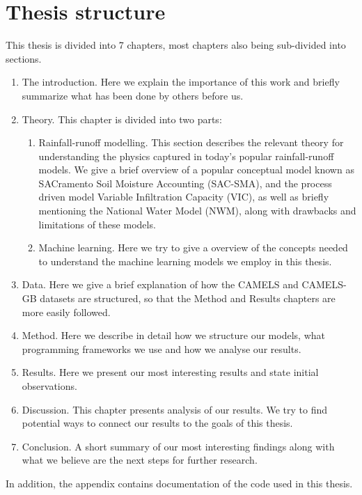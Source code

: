 \section{Thesis structure}
This thesis is divided into 7 chapters, most chapters also being sub-divided into
sections. 
\begin{enumerate}
\item  The introduction. Here we explain the importance of this work and briefly summarize what has been done by others before us.
\item Theory. This chapter is divided into two parts:
    \begin{enumerate}
    \item Rainfall-runoff modelling. This section describes the relevant theory 
        for understanding the physics captured in today's popular rainfall-runoff 
            models. We give a brief overview of a popular conceptual model known 
            as SACramento Soil Moisture Accounting (SAC-SMA), and 
            the process driven model Variable Infiltration Capacity (VIC), as well 
            as briefly mentioning the
            National Water Model (NWM), along with drawbacks and limitations 
            of these models. 
    \item Machine learning. Here we try to give a overview of the concepts 
        needed to understand the machine learning models we employ in this thesis. 
    \end{enumerate}
    \item Data. Here we give a brief explanation of how the CAMELS and CAMELS-GB 
    datasets are structured, so that the Method and Results chapters are more easily followed.
    \item Method. Here we describe in detail how we structure our models, what 
    programming frameworks we use and how we analyse our results.     
    \item Results. Here we present our most interesting results and state initial 
        observations.
    \item Discussion. This chapter presents analysis of our results. We try to 
        find potential ways to connect our results to the goals of this thesis.
    \item Conclusion. A short summary of our most interesting findings along with 
        what we believe are the next steps for further research.
\end{enumerate}
In addition, the appendix contains documentation of the code used in this thesis.
\begin{comment}
\nocite{4160265}
\nocite{mckinney-proc-scipy-2010}
\nocite{2020NumPy-Array}
\nocite{2020SciPy-NMeth}
\nocite{NEURIPS2019_9015}
\nocite{Prechelt1998}
\end{comment}
